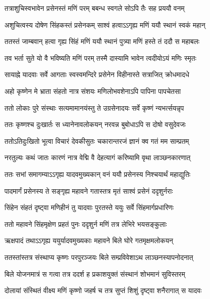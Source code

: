 \twolineshloka
{तत्राशुचिस्वभावेन प्रसेनस्तं मणिं परम्}
{बबन्ध स्वगले सोऽपि तैः सह प्रययौ वनम्} %

\twolineshloka
{अशुचित्वस्य दोषेण सिंहकस्तं प्रसेनकम्}
{साश्वं हत्वाऽऽगृह्य मणिं ययौ स्थानं स्वकं महान्} %

\twolineshloka
{ततस्तं जाम्बवान् हत्वा गृह्य सिंहं मणिं ययौ}
{स्थानं पुत्र्या मणिं हस्ते तं ददौ स महाबलः} %

\twolineshloka
{तव भर्ता सुते यो वै भविष्यति मणिं परम्}
{तस्मै दास्यामि भावेन त्वदीयोऽयं मणिः स्मृतः} %

\twolineshloka
{सायाह्ने यादवाः सर्वे आगताः स्वस्वमन्दिरे}
{प्रसेनेन विहीनास्ते सत्राजित् क्रोधमादधे} %

\twolineshloka
{अहो कृष्णेन मे भ्राता संहतो नात्र संशयः}
{मणिलोभवशेनाऽपि पापिना पापचेतसा} %

\twolineshloka
{ततो लोकाः पुरे संस्थाः सत्यमामानयंस्तु ते}
{उग्रसेनादयः सर्वे कृष्णं न्यभर्त्सयन्नृप} %

\twolineshloka
{ततः कृष्णश्च दुःखार्तः स ध्यानेनावलोकयन्}
{नरवन्न बुबोधाऽपि स दोषो वसुदेवजः} %

\twolineshloka
{ततोऽतिदुःखितो भूत्वा विचारं देवकीसुतः}
{चकारान्तरजं ज्ञानं क्व गतं मम साम्प्रतम्} %

\twolineshloka
{नरतुल्यः कथं जातः कारणं नात्र वेद्मि वै}
{देहत्यागं करिष्यामि वृथा लाञ्छनकारणात्} %

\twolineshloka
{ततः सभां समागम्याऽऽगृह्य यादवमुख्यकान्}
{वनं ययौ प्रसेनस्य निश्चयार्थं महाद्युतिः} %

\twolineshloka
{पादमार्गं प्रसेनस्य ते सङ्गृह्य महावने}
{गतास्तत्र मृतं साश्वं प्रसेनं ददृशुर्नराः} %

\twolineshloka
{सिंहेन संहतं दृष्ट्वा मणिहीनं तु यादवाः}
{पुरतस्ते ययुः सर्वे सिंहमार्गप्रधारिणः} %

\twolineshloka
{ततो महावने सिंहमृक्षेण प्रहतं पुनः}
{ददृशुर्न मणिं तत्र लेभिरे भयसङ्कुलाः} %

\twolineshloka
{ऋक्षपादं तथाऽऽगृह्य ययुर्यादवमुख्यकाः}
{महावने बिले घोरे गतमृक्षमलोकयन्} %

\twolineshloka
{ततस्तांस्तत्र संस्थाप्य कृष्णः परपुरञ्जयः}
{बिले सम्प्रविवेशाऽथ लाञ्छनस्यापनोदनात्} %

\twolineshloka
{बिले योजनमात्रं स गत्वा तत्र ददर्श ह}
{प्रकाशयुक्तं संस्थानं शोभमानं सुविस्तरम्} %

\twolineshloka
{दोलायां संस्थितं वीक्ष्य मणिं कृष्णो जहर्ष च}
{तत्र सुप्तं शिशुं दृष्ट्वा शनैरागात् स यादवः} %

